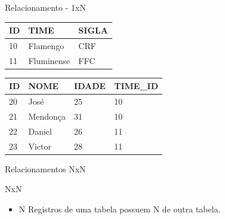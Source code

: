 \documentclass{beamer}
\begin{document}
\begin{frame}{Relacionamento - 1xN}
	\begin{center}
		\begin{table}
			\begin{tabular}{ l | l | l}
					\hline
					\hline
					\hline					
					\rowcolor{header-color} \color{white}\textbf{ID} & \color{white}\textbf{TIME}  & \color{white}\textbf{SIGLA} \\
					\hline
					\rowcolor{red} 10 & Flamengo & CRF \\
					\hline
					\rowcolor{blue} 11 & Fluminense & FFC \\
					\hline
					\hline
			\end{tabular}%
		\end{table}
		\begin{table}
			\begin{tabular}{ l | l | l | l}
				\hline
				\hline
				\hline					
				\rowcolor{header-color} \color{white}\textbf{ID} & \color{white}\textbf{NOME}  & \color{white}\textbf{IDADE}  & \color{white}\textbf{TIME\_ID}\\
				\hline
				\rowcolor{red} 20  & José & 25 & 10 \\
				\hline
				\rowcolor{red}  21  & Mendonça & 31 & 10 \\
				\hline
				\rowcolor{blue} 22 & Daniel & 26 & 11 \\
				\hline
				\rowcolor{blue} 23 & Victor & 28 & 11 \\
				\hline
				\hline
			\end{tabular}%
		\end{table}
		
	\end{center}
\end{frame}

\begin{frame}{Relacionamentos NxN}
	\begin{block} {\LARGE NxN}
		\begin{itemize} \itemsep 2em
			\item{\LARGE N Registros de uma tabela possuem N de outra tabela.}
		\end{itemize}
	\end{block}
\end{frame}
\end{document}
